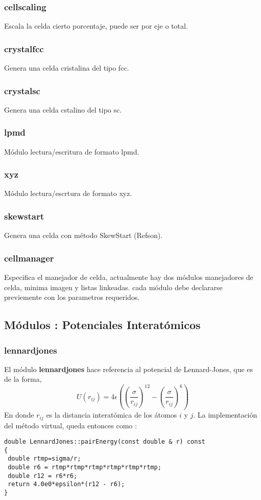 \documentclass[a4paper,10pt]{scrbook}
\begin{document}
\subsubsection{cellscaling}
Escala la celda cierto porcentaje, puede ser por eje o total.
\subsubsection{crystalfcc}
Genera una celda cristalina del tipo fcc.
\subsubsection{crystalsc}
Genera una celda cstalino del tipo sc.
\subsubsection{lpmd}
M\'odulo lectura/escritura de formato lpmd.
\subsubsection{xyz}
M\'odulo lectura/escrtura de formato xyz.
\subsubsection{skewstart}
Genera una celda con m\'etodo SkewStart (Refson).
\subsubsection{cellmanager}
Especifica el manejador de celda, actualmente hay dos m\'odulos manejadores de celda, minima imagen y listas linkeadas. cada m\'odulo debe declararse previemente con los parametros requeridos.

\subsection{M\'odulos : Potenciales Interat\'omicos}
\subsubsection{lennardjones}
El m\'odulo \textbf{lennardjones} hace referencia al potencial de Lennard-Jones, que es de la forma,
$$U(r_{ij}) = 4\epsilon\left(\left(\frac{\sigma}{r_{ij}}\right)^{12}-\left(\frac{\sigma}{r_{ij}}\right)^6\right)$$
En donde $r_{ij}$ es la distancia interat\'omica de los \'atomos $i$ y $j$. La implementaci\'on del m\'etodo virtual, queda entonces como :
\begin{verbatim}
double LennardJones::pairEnergy(const double & r) const
{
 double rtmp=sigma/r;
 double r6 = rtmp*rtmp*rtmp*rtmp*rtmp*rtmp;
 double r12 = r6*r6;
 return 4.0e0*epsilon*(r12 - r6);
}
\end{verbatim}
\end{document}
